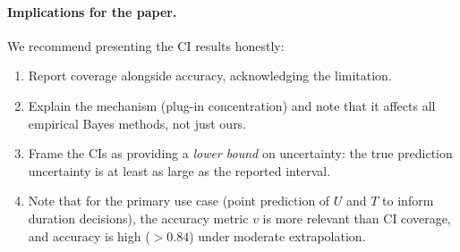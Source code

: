 \paragraph{Implications for the paper.}
We recommend presenting the CI results honestly:
\begin{enumerate}[leftmargin=*]
  \item Report coverage alongside accuracy, acknowledging the
        limitation.
  \item Explain the mechanism (plug-in concentration) and note
        that it affects all empirical Bayes methods, not just ours.
  \item Frame the CIs as providing a \emph{lower bound} on
        uncertainty: the true prediction uncertainty is at least
        as large as the reported interval.
  \item Note that for the primary use case (point prediction of
        $U$ and $T$ to inform duration decisions), the accuracy
        metric $v$ is more relevant than CI coverage, and
        accuracy is high ($>0.84$) under moderate extrapolation.
\end{enumerate}
